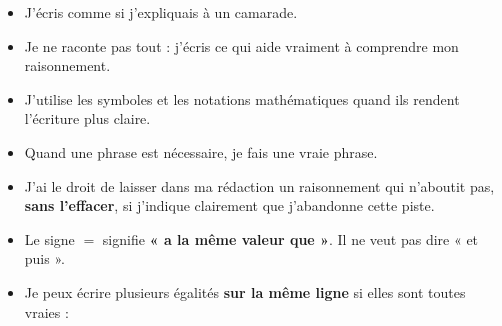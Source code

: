 \documentclass[10pt,a4paper]{article}
\begin{document}
\begin{minipage}[t]{0.485\textwidth}
\vspace{0pt}


\begin{tcolorbox}[
  enhanced,
  colback=white,
  colframe=ActionC!65,
  boxrule=0.6pt,
  arc=2mm,
  title={\sffamily\bfseries Je me fais comprendre},
  coltitle=ActionC,
  fonttitle=\normalsize,
  left=2.5mm,right=2.5mm,top=1.4mm,bottom=1.4mm
]
\small
\begin{itemize}
  \item J'écris comme si j'expliquais à un camarade.

  \item Je ne raconte pas tout : j'écris ce qui aide vraiment à comprendre mon raisonnement.

  \item J'utilise les symboles et les notations mathématiques quand ils rendent l'écriture plus claire.

  \item Quand une phrase est nécessaire, je fais une vraie phrase.

  \item J'ai le droit de laisser dans ma rédaction un raisonnement qui n'aboutit pas,
  \textbf{sans l'effacer}, si j'indique clairement que j'abandonne cette piste.
\end{itemize}
\end{tcolorbox}

\vspace{0.3em}


\begin{tcolorbox}[
  enhanced,
  colback=white,
  colframe=SavoirC!65,
  boxrule=0.6pt,
  arc=2mm,
  title={\sffamily\bfseries Mes calculs doivent rester vrais},
  coltitle=SavoirC,
  fonttitle=\normalsize,
  left=2.5mm,right=2.5mm,top=1.4mm,bottom=1.4mm
]
\small

\begin{itemize}
  \item Le signe \(=\) signifie \textbf{« a la même valeur que »}.
  Il ne veut pas dire « et puis ».

  \item Je peux écrire plusieurs égalités \textbf{sur la même ligne}
  si elles sont toutes vraies :
\end{itemize}


\end{tcolorbox}
\end{minipage}
\end{document}
